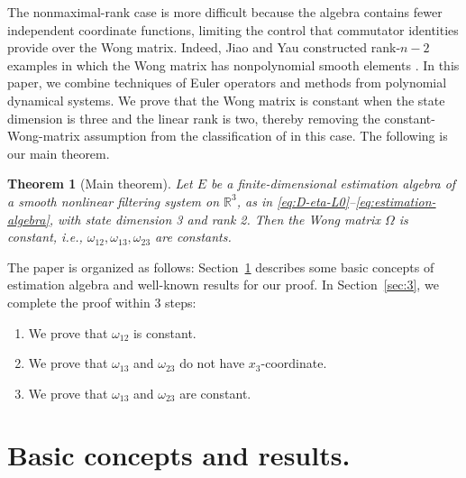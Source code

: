 \documentclass{tCON2e}
\newenvironment{revision}{\begingroup\color{black}}{\endgroup}
\numberwithin{equation}{section}
\theoremstyle{journalplain}
\newtheorem{theorem}{Theorem}[section]
\theoremstyle{journaldef}
\newenvironment{revision}{}{}
\begin{document}
\begin{revision}
The nonmaximal-rank case is more difficult because the algebra
contains fewer independent coordinate functions, limiting the
control that commutator identities provide over the Wong matrix.
Indeed, Jiao and Yau constructed rank-$n-2$ examples in which
the Wong matrix has nonpolynomial smooth elements
\citep{Jiao2020New}.
In this paper, we combine techniques of Euler operators and methods from polynomial dynamical systems. We prove that the Wong
matrix is constant when the state dimension is three and the
linear rank is two, thereby removing the constant-Wong-matrix
assumption from the classification of \citep{Yu2024Complete}
in this case. The following is our main theorem.
\begin{theorem}[Main theorem]\label{thm:main}
Let $E$ be a finite-dimensional estimation algebra of a smooth nonlinear
filtering system on $\mathbb R^3$, as in
\eqref{eq:D-eta-L0}--\eqref{eq:estimation-algebra}, with state dimension 3 and rank 2. Then the Wong matrix $\Omega$ is constant, i.e., $\omega_{12},\omega_{13},\omega_{23}$ are constants.
\end{theorem}

The paper is organized as follows: Section~\ref{sec:2} describes some basic concepts of estimation algebra and well-known results for our proof. In Section~\ref{sec:3}, we complete the proof within 3 steps: 
\begin{enumerate}
    \item We prove that $\omega_{12}$ is constant.
    \item We prove that $\omega_{13}$ and $\omega_{23}$ do not have $x_3$-coordinate.
    \item We prove that $\omega_{13}$ and $\omega_{23}$ are constant.
\end{enumerate}

\section{Basic concepts and results.}
\label{sec:2}



\end{revision}
\end{document}
